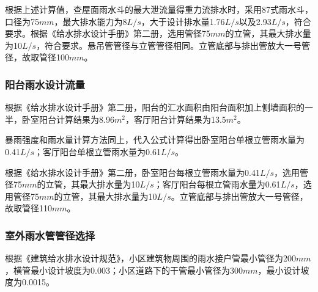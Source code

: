 \documentclass{gdutart}
\begin{document}
        根据上述计算值，查屋面雨水斗的最大泄流量得重力流排水时，采用87式雨水斗，口径为75$mm$，最大排水能力为8$L/s$，大于设计排水量1.76$L/s$以及2.93$L/s$，符合要求。根据《给水排水设计手册》第二册，选用管径75$mm$的立管，其最大排水量为10$L/s$，符合要求。悬吊管管径与立管管径相同。立管底部与排出管放大一号管径，故取管径100$mm$。

      \subsubsection{阳台雨水设计流量}
        根据《给水排水设计手册》第二册，阳台的汇水面积由阳台面积加上侧墙面积的一半，卧室阳台计算结果为8.96$m^2$，客厅阳台计算结果为13.5$m^2$。

        暴雨强度和雨水量计算方法同上，代入公式计算得出卧室阳台单根立管雨水量为0.41$L/s$；客厅阳台单根立管雨水量为0.61$L/s$。

        根据《给水排水设计手册》第二册，卧室阳台每根立管雨水量为0.41$L/s$，选用管径75$mm$的立管，其最大排水量为10$L/s$；客厅阳台每根立管雨水量为0.61$L/s$，选用管径75$mm$的立管，其最大排水量为10$L/s$。立管底部与排出管放大一号管径，故取管径110$mm$。

      \subsubsection{室外雨水管管径选择}
        根据《建筑给水排水设计规范》，小区建筑物周围的雨水接户管最小管径为200$mm$，横管最小设计坡度为0.003；小区道路下的干管最小管径为300$mm$，最小设计坡度为0.0015。
\end{document}
